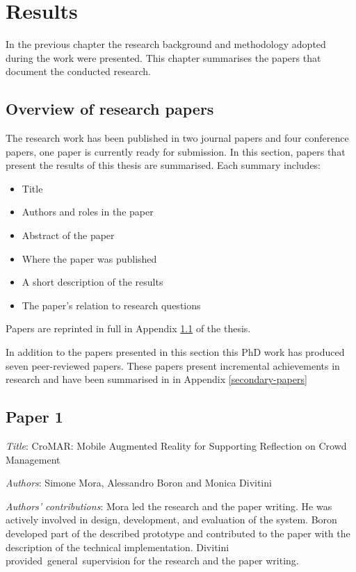 \chapter{Results}\label{results}


In the previous chapter the research background and methodology adopted during the work were presented. This chapter summarises the papers that document the conducted research.

\section{Overview of research papers}\label{papers}

The research work has been published in two journal papers and four conference papers, one paper is currently ready for submission. In this section, papers that present the results of this thesis are summarised. Each summary includes: 
\begin{itemize}
	\itemsep1pt\parskip0pt 
	\item Title 
	\item Authors and roles in the paper 
	\item Abstract of the paper
	\item Where the paper was published 
	\item A short description of the results 
	\item The paper's relation to research questions 
\end{itemize}

Papers are reprinted in full in Appendix \ref{papers} of the thesis.

In addition to the papers presented in this section this PhD work has produced seven peer-reviewed papers. These papers present incremental achievements in research and have been summarised in in Appendix \ref{secondary-papers}

\section[P1: CroMAR: Mobile Augmented Reality for Supporting Reflection on Crowd Management]{Paper 1} \label{paper-1}

\emph{Title}: CroMAR: Mobile Augmented Reality for Supporting Reflection on Crowd Management

\emph{Authors}: Simone Mora, Alessandro Boron and Monica Divitini

\emph{Authors' contributions}: Mora led the research and the paper writing. He was actively involved in design, development, and evaluation of the system. Boron developed part of the described prototype and contributed to the paper with the description of the technical implementation. Divitini provided~general~supervision for the research and the paper writing. 


